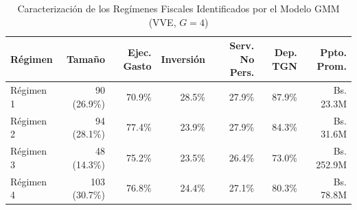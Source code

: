\begin{table}[htbp]
\centering
\footnotesize
\caption{Caracterizaci\'on de los Reg\'imenes Fiscales Identificados por el Modelo GMM (VVE, $G=4$)}
\label{tab:gmm_regimenes}
\begin{tabular}{lrrrrrr}
\hline
\textbf{R\'egimen} & \textbf{Tama\~no} & \textbf{Ejec. Gasto} & \textbf{Inversi\'on} & \textbf{Serv. No Pers.} & \textbf{Dep. TGN} & \textbf{Ppto. Prom.} \\
\hline
R\'egimen 1 & 90 (26.9\%) & 70.9\% & 28.5\% & 27.9\% & 87.9\% & Bs. 23.3M \\
R\'egimen 2 & 94 (28.1\%) & 77.4\% & 23.9\% & 27.9\% & 84.3\% & Bs. 31.6M \\
R\'egimen 3 & 48 (14.3\%) & 75.2\% & 23.5\% & 26.4\% & 73.0\% & Bs. 252.9M \\
R\'egimen 4 & 103 (30.7\%) & 76.8\% & 24.4\% & 27.1\% & 80.3\% & Bs. 78.8M \\
\hline
\end{tabular}
\end{table}
